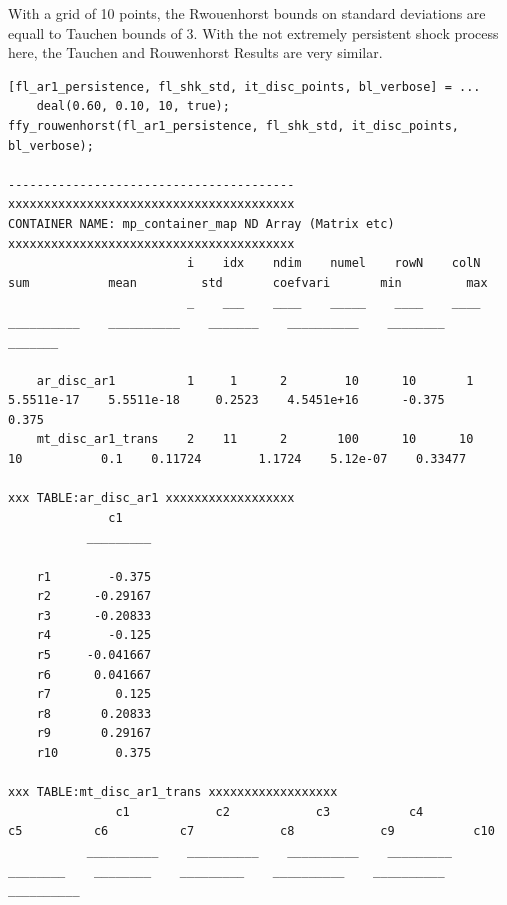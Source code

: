 \documentclass[
]{book}
\begin{document}
With a grid of 10 points, the Rwouenhorst bounds on standard deviations
are equall to Tauchen bounds of 3. With the not extremely persistent
shock process here, the Tauchen and Rouwenhorst Results are very
similar.

\begin{verbatim}
[fl_ar1_persistence, fl_shk_std, it_disc_points, bl_verbose] = ...
    deal(0.60, 0.10, 10, true);
ffy_rouwenhorst(fl_ar1_persistence, fl_shk_std, it_disc_points, bl_verbose);

----------------------------------------
xxxxxxxxxxxxxxxxxxxxxxxxxxxxxxxxxxxxxxxx
CONTAINER NAME: mp_container_map ND Array (Matrix etc)
xxxxxxxxxxxxxxxxxxxxxxxxxxxxxxxxxxxxxxxx
                         i    idx    ndim    numel    rowN    colN       sum           mean         std       coefvari       min         max  
                         _    ___    ____    _____    ____    ____    __________    __________    _______    __________    ________    _______

    ar_disc_ar1          1     1      2        10      10       1     5.5511e-17    5.5511e-18     0.2523    4.5451e+16      -0.375      0.375
    mt_disc_ar1_trans    2    11      2       100      10      10             10           0.1    0.11724        1.1724    5.12e-07    0.33477

xxx TABLE:ar_disc_ar1 xxxxxxxxxxxxxxxxxx
              c1    
           _________

    r1        -0.375
    r2      -0.29167
    r3      -0.20833
    r4        -0.125
    r5     -0.041667
    r6      0.041667
    r7         0.125
    r8       0.20833
    r9       0.29167
    r10        0.375

xxx TABLE:mt_disc_ar1_trans xxxxxxxxxxxxxxxxxx
               c1            c2            c3           c4           c5          c6          c7            c8            c9           c10    
           __________    __________    __________    _________    ________    ________    _________    __________    __________    __________


\end{verbatim}
\end{document}
